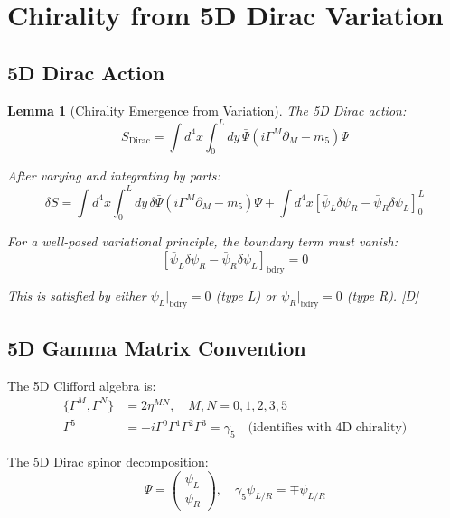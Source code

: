 \documentclass[11pt,a4paper]{article}
\newtheorem{lemma}[theorem]{Lemma}
\newcommand{\tagD}{\textcolor{blue!70!black}{[D]}}
\begin{document}
\section{Chirality from 5D Dirac Variation}
\label{sec:chirality}

\subsection{5D Dirac Action}

\begin{lemma}[Chirality Emergence from Variation]
\label{lem:chirality}
The 5D Dirac action:
\begin{equation}
\label{eq:dirac-action}
S_{\text{Dirac}} = \int d^4x \int_0^L dy\, \bar{\Psi}(i\Gamma^M \partial_M - m_5)\Psi
\end{equation}

After varying and integrating by parts:
\begin{equation}
\label{eq:variation}
\delta S = \int d^4x \int_0^L dy\, \delta\bar{\Psi}(i\Gamma^M \partial_M - m_5)\Psi
+ \int d^4x \left[\bar{\psi}_L \delta\psi_R - \bar{\psi}_R \delta\psi_L\right]_0^L
\end{equation}

For a well-posed variational principle, the boundary term must vanish:
\begin{equation}
\label{eq:bdry-vanish}
\left[\bar{\psi}_L \delta\psi_R - \bar{\psi}_R \delta\psi_L\right]_{\text{bdry}} = 0
\end{equation}

This is satisfied by either $\psi_L|_{\text{bdry}} = 0$ (type L) or $\psi_R|_{\text{bdry}} = 0$ (type R).
\tagD
\end{lemma}

\subsection{5D Gamma Matrix Convention}

The 5D Clifford algebra is:
\begin{align}
\label{eq:clifford-5d}
\{\Gamma^M, \Gamma^N\} &= 2\eta^{MN}, \quad M, N = 0, 1, 2, 3, 5 \\
\label{eq:gamma5-def}
\Gamma^5 &= -i\Gamma^0\Gamma^1\Gamma^2\Gamma^3 = \gamma_5 \quad \text{(identifies with 4D chirality)}
\end{align}

The 5D Dirac spinor decomposition:
\begin{equation}
\label{eq:5d-spinor-decomp}
\Psi = \begin{pmatrix} \psi_L \\ \psi_R \end{pmatrix}, \quad \gamma_5 \psi_{L/R} = \mp \psi_{L/R}
\end{equation}
\end{document}
